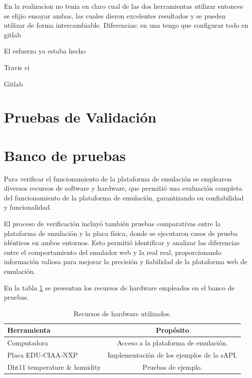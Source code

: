 En la realizacion
no tenia en claro cual de las dos herramientas utilizar entonces se elijio ensayar ambas, las cuales dieron excelentes resultados y se pueden utilizar de forma intercambiable.
Diferencias: en una tengo que configurar todo en gitlab

El esfuerzo ya estaba hecho

Travis ci

Gitlab

\section{Pruebas de Validación}
\label{sec:Pruebas de Validación}

\section{Banco de pruebas}

Para verificar el funcionamiento de la plataforma de emulación se emplearon diversos recursos de software y hardware, que permitió una evaluación completa del funcionamiento de la plataforma de emulación, garantizando su confiabilidad y funcionalidad. 

El proceso de verificación incluyó también pruebas comparativas entre la plataforma de emulación y la placa física, donde se ejecutaron casos de prueba idénticos en ambos entornos. Esto permitió identificar y analizar las diferencias entre el comportamiento del emulador web y la real real, proporcionando información valiosa para mejorar la precisión y fiabilidad de la plataforma web de emulación.



En la tabla \ref{tab:RecursosHardware} se presentan los recursos de hardware empleados en el banco de pruebas.

\begin{table}[h]
	\centering
	\caption[Recursos de hardware utilizados]{Recursos de hardware utilizados.}
	\begin{tabular}{l c}    
		\toprule
		\textbf{Herramienta} & \textbf{Propósito}\\
		\midrule
		Computadora & Acceso a la plataforma de emulación.\\		
		Placa EDU-CIAA-NXP &  Implementación de los ejemplos de la sAPI.\\
		Dht11 temperature \& humidity  &  Pruebas de ejemplo.\\
		\bottomrule
		\hline
	\end{tabular}
	\label{tab:RecursosHardware}
\end{table}


